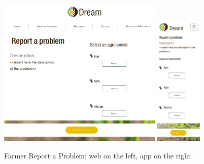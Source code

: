 \documentclass{article}
\begin{document}
        \newpage
        \begin{figure} [h]
            \centering
            \includegraphics[width=0.7\textwidth]{images/UserInterfaces/Farmer/ProductionAndProblems/ReportProblemWeb.png}
            \quad
            \includegraphics[width=0.2\textwidth]{images/UserInterfaces/Farmer/ProductionAndProblems/ReportProblemApp.png}
            \quad
            \caption{\label{fig:farmerReportProblem}Farmer Report a Problem; web on the left, app on the right}
        \end{figure}
    
    
    \newpage
    
\end{document}

